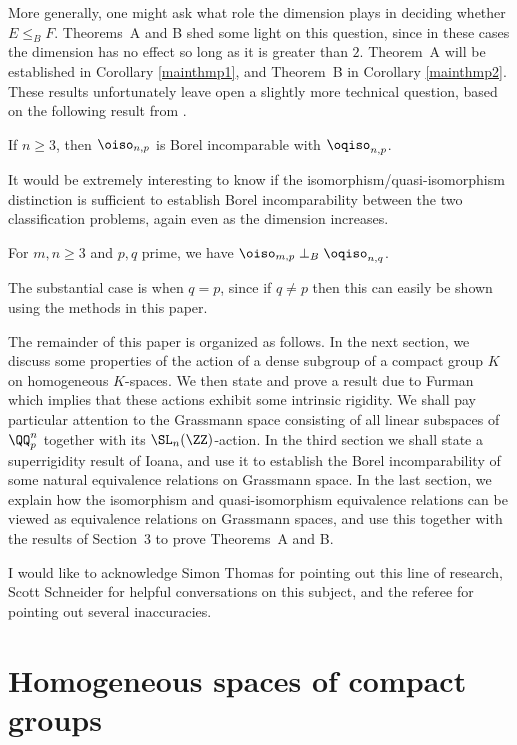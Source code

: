 \documentclass[oneside,leqno,11pt]{amsart}
\begin{document}
More generally, one might ask what role the dimension plays in
deciding whether $E\leq_BF$.  Theorems~A and B shed some light on this
question, since in these cases the dimension has no effect so long as
it is greater than $2$.  Theorem~A will be established in Corollary
\ref{mainthmp1}, and Theorem~B in Corollary \ref{mainthmp2}.  These
results unfortunately leave open a slightly more technical question,
based on the following result from \cite{quasi}.

\begin{thm*}
  If $n\geq3$, then $\oiso_{n,p}$ is Borel incomparable with
  $\oqiso_{n,p}$.
\end{thm*}

It would be extremely interesting to know if the
isomorphism/quasi-isomorphism distinction is sufficient to establish
Borel incomparability between the two classification problems, again
even as the dimension increases.

\begin{conj*}
  For $m,n\geq3$ and $p,q$ prime, we have
  $\oiso_{m,p}\perp_B\oqiso_{n,q}$.
\end{conj*}

The substantial case is when $q=p$, since if $q\neq p$ then this can
easily be shown using the methods in this paper.

The remainder of this paper is organized as follows.  In the next
section, we discuss some properties of the action of a dense subgroup
of a compact group $K$ on homogeneous $K$-spaces.  We then state and
prove a result due to Furman which implies that these actions exhibit
some intrinsic rigidity.  We shall pay particular attention to the
Grassmann space consisting of all linear subspaces of $\QQ_p^n$
together with its $\SL_n(\ZZ)$-action.  In the third section we shall
state a superrigidity result of Ioana, and use it to establish the
Borel incomparability of some natural equivalence relations on
Grassmann space.  In the last section, we explain how the isomorphism
and quasi-isomorphism equivalence relations can be viewed as
equivalence relations on Grassmann spaces, and use this together with
the results of Section~3 to prove Theorems~A and B.

I would like to acknowledge Simon Thomas for pointing out this line of
research, Scott Schneider for helpful conversations on this
subject, and the referee for pointing out several inaccuracies.

\section{Homogeneous spaces of compact groups}
\end{document}
